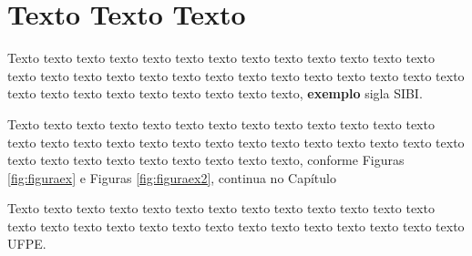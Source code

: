 \section{Texto Texto Texto}
\label{motivacao}

Texto texto texto texto texto texto texto texto texto texto texto texto texto texto texto texto texto texto texto texto texto texto texto texto texto texto texto texto texto texto texto texto texto texto texto texto, \textbf{exemplo} sigla \gls{SIBI}.



Texto texto texto texto texto texto texto texto texto texto texto texto texto texto texto texto texto texto texto texto texto texto texto texto texto texto texto texto texto texto texto texto texto texto texto texto, conforme Figuras \ref{fig:figuraex} e Figuras \ref{fig:figuraex2}, continua no Capítulo %




Texto texto texto texto texto texto texto texto texto texto texto texto texto texto texto texto texto texto texto texto texto texto texto texto texto texto texto \gls{UFPE}.
